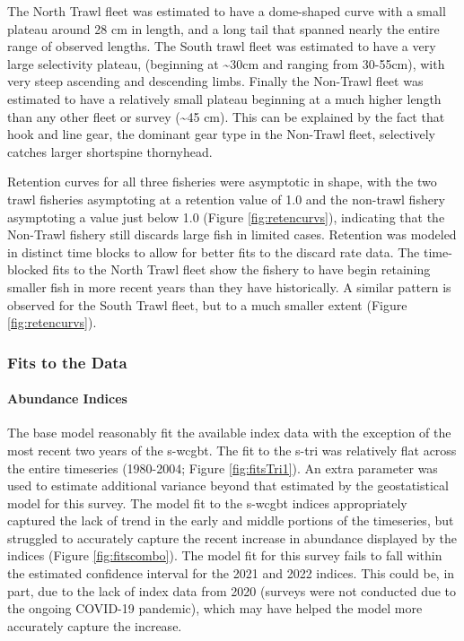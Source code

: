 \documentclass[11pt,
  english,
  letterpaper,
]{article}
\begin{document}
The North Trawl fleet was estimated to have a dome-shaped curve with a small plateau around 28 cm in length, and a long tail that spanned nearly the entire range of observed lengths. The South trawl fleet was estimated to have a very large selectivity plateau, (beginning at \textasciitilde30cm and ranging from 30-55cm), with very steep ascending and descending limbs. Finally the Non-Trawl fleet was estimated to have a relatively small plateau beginning at a much higher length than any other fleet or survey (\textasciitilde45 cm). This can be explained by the fact that hook and line gear, the dominant gear type in the Non-Trawl fleet, selectively catches larger shortspine thornyhead.

Retention curves for all three fisheries were asymptotic in shape, with the two trawl fisheries asymptoting at a retention value of 1.0 and the non-trawl fishery asymptoting a value just below 1.0 (Figure \ref{fig:retencurvs}), indicating that the Non-Trawl fishery still discards large fish in limited cases. Retention was modeled in distinct time blocks to allow for better fits to the discard rate data. The time-blocked fits to the North Trawl fleet show the fishery to have begin retaining smaller fish in more recent years than they have historically. A similar pattern is observed for the South Trawl fleet, but to a much smaller extent (Figure \ref{fig:retencurvs}).

\hypertarget{fits-to-the-data}{%
\subsubsection{Fits to the Data}\label{fits-to-the-data}}

\hypertarget{abundance-indices}{%
\paragraph{Abundance Indices}\label{abundance-indices}}

The base model reasonably fit the available index data with the exception of the most recent two years of the \gls{s-wcgbt}. The fit to the \gls{s-tri} was relatively flat across the entire timeseries (1980-2004; Figure \ref{fig:fitsTri1}). An extra parameter was used to estimate additional variance beyond that estimated by the geostatistical model for this survey. The model fit to the \gls{s-wcgbt} indices appropriately captured the lack of trend in the early and middle portions of the timeseries, but struggled to accurately capture the recent increase in abundance displayed by the indices (Figure \ref{fig:fitscombo}). The model fit for this survey fails to fall within the estimated confidence interval for the 2021 and 2022 indices. This could be, in part, due to the lack of index data from 2020 (surveys were not conducted due to the ongoing COVID-19 pandemic), which may have helped the model more accurately capture the increase.
\end{document}
